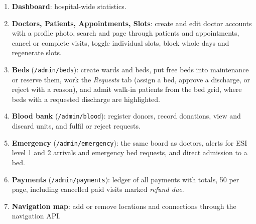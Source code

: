 \begin{enumerate}
    \item \textbf{Dashboard}: hospital-wide statistics.
    \item \textbf{Doctors, Patients, Appointments, Slots}: create and edit doctor accounts with a profile photo, search and page through patients and appointments, cancel or complete visits, toggle individual slots, block whole days and regenerate slots.
    \item \textbf{Beds} (\texttt{/admin/beds}): create wards and beds, put free beds into maintenance or reserve them, work the \emph{Requests} tab (assign a bed, approve a discharge, or reject with a reason), and admit walk-in patients from the bed grid, where beds with a requested discharge are highlighted.
    \item \textbf{Blood bank} (\texttt{/admin/blood}): register donors, record donations, view and discard units, and fulfil or reject requests.
    \item \textbf{Emergency} (\texttt{/admin/emergency}): the same board as doctors, alerts for ESI level 1 and 2 arrivals and emergency bed requests, and direct admission to a bed.
    \item \textbf{Payments} (\texttt{/admin/payments}): ledger of all payments with totals, 50 per page, including cancelled paid visits marked \emph{refund due}.
    \item \textbf{Navigation map}: add or remove locations and connections through the navigation API.
\end{enumerate}
